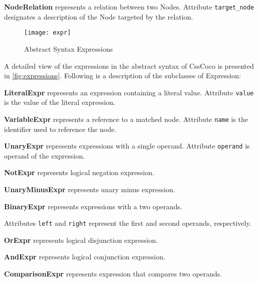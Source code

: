 \begin{description}
\item\textbf{NodeRelation} represents a relation between two Nodes. Attribute \texttt{target\_node}
designates a description of the Node targeted by the relation.

\end{description}


\begin{figure}[h!]
  \centering
  \caption{Abstract Syntax Expressions}
  \label{fig:expressions}
  \texttt{[image: expr]}
\end{figure}

A detailed view of the expressions in the abstract syntax of CssCoco is presented in \autoref{fig:expressions}. Following is a description of the subclasses of Expression:

\begin{description}

\item\textbf{LiteralExpr} represents an expression containing a literal value. Attribute \texttt{value} is the value of the literal expression.

\item\textbf{VariableExpr} represents a reference to a matched node. Attribute \texttt{name} is the identifier used to reference the node.

\item\textbf{UnaryExpr} represents expressions with a single operand. Attribute \texttt{operand} is operand of the expression.

\item\textbf{NotExpr} represents logical negation expression.

\item\textbf{UnaryMinusExpr} represents unary minus expression.

\item\textbf{BinaryExpr} represents expressions with a two operands.

Attributes \texttt{left} and \texttt{right} represent the first and second operands, respectively.

\item\textbf{OrExpr} represents logical disjunction expression.

\item\textbf{AndExpr} represents logical conjunction expression.

\item\textbf{ComparisonExpr} represents expression that compares two operands.


\end{description}
